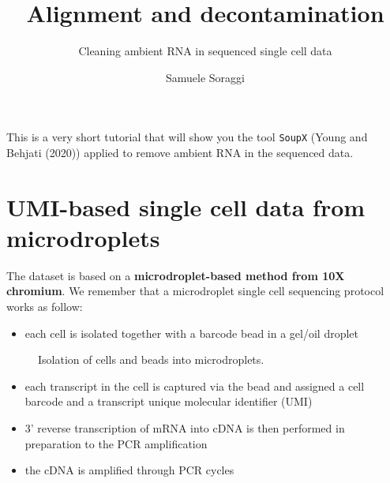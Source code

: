 \documentclass[
  letterpaper,
  DIV=11,
  numbers=noendperiod]{scrartcl}
\title{Alignment and decontamination}
\subtitle{Cleaning ambient RNA in sequenced single cell data}
\author{Samuele Soraggi}
\date{}
\providecommand{\tightlist}{%
  \setlength{\itemsep}{0pt}\setlength{\parskip}{0pt}}\usepackage{longtable,booktabs,array}
\renewcommand*\contentsname{Table of contents}
\newcommand\contentsname{Table of contents}
\begin{document}
\maketitle

\renewcommand*\contentsname{Table of contents}
{
\hypersetup{linkcolor=}
\setcounter{tocdepth}{3}
\tableofcontents
}
This is a very short tutorial that will show you the tool \texttt{SoupX}
(Young and Behjati (2020)) applied to remove ambient RNA in the
sequenced data.

\section{UMI-based single cell data from
microdroplets}\label{umi-based-single-cell-data-from-microdroplets}

The dataset is based on a \textbf{microdroplet-based method from 10X
chromium}. We remember that a microdroplet single cell sequencing
protocol works as follow:

\begin{itemize}
\tightlist
\item
  each cell is isolated together with a barcode bead in a gel/oil
  droplet
\end{itemize}

\begin{figure}


\caption{\label{fig-beads}Isolation of cells and beads into
microdroplets.}

\end{figure}%

\begin{itemize}
\tightlist
\item
  each transcript in the cell is captured via the bead and assigned a
  cell barcode and a transcript unique molecular identifier (UMI)
\item
  3' reverse transcription of mRNA into cDNA is then performed in
  preparation to the PCR amplification
\item
  the cDNA is amplified through PCR cycles
\end{itemize}
\end{document}
